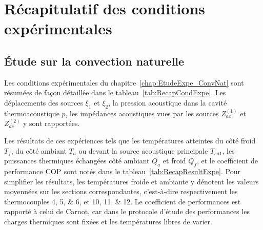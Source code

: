\chapter{Récapitulatif des conditions expérimentales}
\section{\'Etude sur la convection naturelle}
Les conditions expérimentales du chapitre~\ref{chap:EtudeExpe_ConvNat} sont résumées de façon détaillée dans le tableau~\ref{tab:RecapCondExpe}. Les déplacements des sources $\xi_1$ et $\xi_2$, la pression acoustique dans la cavité thermoacoustique $p$, les impédances acoustiques vues par les sources $Z_{ac}^{(1)}$ et $Z_{ac}^{(2)}$ y sont rapportées.

Les résultats de ces expériences tels que les températures atteintes du côté froid $T_f$, du côté ambiant $T_a$ ou devant la source acoustique principale $T_{sa1}$, les puissances thermiques échangées côté ambiant $Q_a$ et froid $Q_f$, et le coefficient de performance $\mathrm{COP}$ sont notés dans le tableau~\ref{tab:RecapResultExpe}. Pour simplifier les résultats, les températures froide et ambiante y dénotent les valeurs moyennées sur les sections correspondantes, c'est-à-dire respectivement les thermocouples \numlist{4;5;6}, et \numlist{10;11;12}. Le coefficient de performances est rapporté à celui de Carnot, car dans le protocole d'étude des performances les charges thermiques sont fixées et les températures libres de varier.

